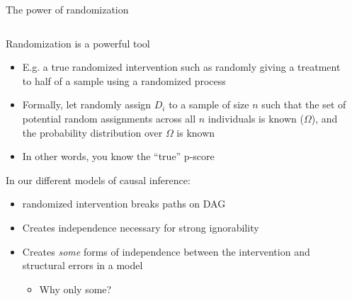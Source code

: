 \documentclass[notes,11pt, aspectratio=169]{beamer}
\newenvironment{wideitemize}{\itemize\addtolength{\itemsep}{10pt}}{\enditemize}
\begin{document}
\begin{frame}{The power of randomization}
\begin{columns}[T] %
\begin{column}{.65\textwidth}
  \begin{wideitemize}
  \item Randomization is a powerful tool
    \begin{itemize}
    \item E.g. a true randomized intervention such as randomly giving
      a treatment to half of a sample using a randomized process
    \item Formally, let randomly assign $D_{i}$ to a sample of size
      $n$ such that the set of potential random assignments across all
      $n$ individuals is known ($\Omega$), and the probability
      distribution over $\Omega$ is known
    \item In other words, you know the ``true'' p-score
    \end{itemize}
  \item In our different models of causal inference:
    \begin{itemize}
    \item<2-> randomized intervention breaks paths on DAG      
    \item<4-> Creates independence necessary for strong ignorability
    \item<5-> Creates \emph{some} forms of independence between the
      intervention and structural errors in a model
      \begin{itemize}
      \item Why only some?
      \end{itemize}
    \end{itemize}
  \end{wideitemize}
\end{column}%
\hfill%
\begin{column}{.4\textwidth}
  \begin{center}
\end{center}
\end{column}
\end{columns}
\end{frame}
\end{document}
